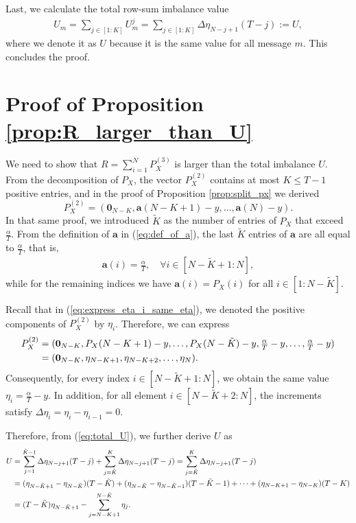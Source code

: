 \documentclass[11pt,letterpaper]{article}
\begin{document}
Last, we calculate the total row-sum imbalance value 
\begin{align}
    U_m = \sum_{j \in [1:K]} U^j_m = \sum_{j \in [1:K]} \Delta\eta_{N-j+1}(T-j) := U, \label{eq:total_U}
\end{align}
where we denote it as $U$ because it is the same value for all message $m$. This concludes the proof.  


\section{Proof of Proposition \ref{prop:R_larger_than_U}} \label{sec:proof_R_larger_than_U}

We need to show that $R = \sum_{i=1}^N P_X^{(3)}$ is larger than the total imbalance \(U\). From the decomposition of \(P_X\), the vector \(P_X^{(2)}\) contains at most \(K \leq T-1\) positive entries, and in the proof of Proposition \ref{prop:split_px} we derived
\[
P_X^{(2)} = (\mathbf{0}_{N-K}, \boldsymbol{a}(N-K+1)-y, \dots, \boldsymbol{a}(N)-y).
\]
In that same proof, we introduced \(\tilde{K}\) as the number of entries of \(P_X\) that exceed \(\frac{\alpha}{T}\). From the definition of \(\boldsymbol{a}\) in (\ref{eq:def_of_a}), the last \(\tilde{K}\) entries of \(\boldsymbol{a}\) are all equal to \(\frac{\alpha}{T}\), that is,
\begin{align}
    \boldsymbol{a}(i) = \frac{\alpha}{T}, \quad \forall i \in [N-\tilde{K}+1:N], \label{eq:a_tail_is_alpha/T}
\end{align}
while for the remaining indices we have \(\boldsymbol{a}(i) = P_X(i)\) for all \(i \in [1:N-\tilde{K}]\).

Recall that in (\ref{eq:express_eta_i_same_eta}), we denoted the positive components of \(P_X^{(2)}\) by \(\eta_i\). Therefore, we can express
\begin{align}
    P_X^{(2)} & = (\mathbf{0}_{N-K}, P_X(N-K+1)-y, \dots, P_X(N-\tilde{K})-y, \tfrac{\alpha}{T}-y, \dots, \tfrac{\alpha}{T}-y) \notag \\
    & = (\mathbf{0}_{N-K}, \eta_{N-K+1}, \eta_{N-K+2}, \dots, \eta_N).
\end{align}
Consequently, for every index \(i \in [N-\tilde{K}+1:N]\), we obtain the same value \(\eta_i = \tfrac{\alpha}{T} - y\). In addition, for all element \(i \in [N-\tilde{K}+2:N]\), the increments satisfy \(\Delta\eta_i = \eta_i - \eta_{i-1} = 0\). 

Therefore, from (\ref{eq:total_U}), we further derive $U$ as 
\begin{align}
    U & = \sum_{j=1}^{\tilde{K}-1} \Delta\eta_{N-j+1}(T-j) + \sum_{j=\tilde{K}}^{K} \Delta\eta_{N-j+1}(T-j) = \sum_{j=\tilde{K}}^{K} \Delta\eta_{N-j+1}(T-j) \notag \\
    & = (\eta_{N-\tilde{K}+1} - \eta_{N-\tilde{K}}) (T-\tilde{K}) + (\eta_{N-\tilde{K}} - \eta_{N-\tilde{K}-1}) (T-\tilde{K}-1) + \cdots + (\eta_{N-{K}+1} - \eta_{N-K}) (T-K) \notag \\
    & = (T-\tilde{K})\eta_{N-\tilde{K}+1} - \sum_{j = N-K+1}^{N-\tilde{K}} \eta_j.
\end{align}
\end{document}
